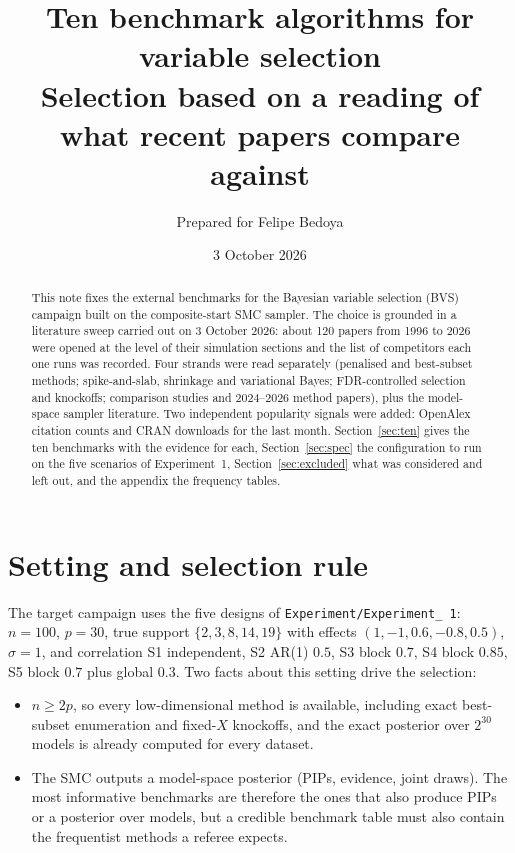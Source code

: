 \documentclass[11pt,letterpaper]{article}
\title{\bfseries Ten benchmark algorithms for variable selection\\[4pt]
\large Selection based on a reading of what recent papers compare against}
\author{Prepared for Felipe Bedoya}
\date{3 October 2026}
\newcommand{\code}[1]{\texttt{#1}}
\begin{document}
\maketitle

\begin{abstract}
\noindent This note fixes the external benchmarks for the Bayesian variable selection (BVS) campaign built on the composite-start SMC sampler. The choice is grounded in a literature sweep carried out on 3 October 2026: about 120 papers from 1996 to 2026 were opened at the level of their simulation sections and the list of competitors each one runs was recorded. Four strands were read separately (penalised and best-subset methods; spike-and-slab, shrinkage and variational Bayes; FDR-controlled selection and knockoffs; comparison studies and 2024--2026 method papers), plus the model-space sampler literature. Two independent popularity signals were added: OpenAlex citation counts and CRAN downloads for the last month. Section~\ref{sec:ten} gives the ten benchmarks with the evidence for each, Section~\ref{sec:spec} the configuration to run on the five scenarios of Experiment~1, Section~\ref{sec:excluded} what was considered and left out, and the appendix the frequency tables.
\end{abstract}

\tableofcontents

\section{Setting and selection rule}

The target campaign uses the five designs of \code{Experiment/Experiment\_ 1}: $n=100$, $p=30$, true support $\{2,3,8,14,19\}$ with effects $(1,-1,0.6,-0.8,0.5)$, $\sigma=1$, and correlation S1 independent, S2 AR(1) $0.5$, S3 block $0.7$, S4 block $0.85$, S5 block $0.7$ plus global $0.3$. Two facts about this setting drive the selection:
\begin{itemize}
\item $n\ge 2p$, so every low-dimensional method is available, including exact best-subset enumeration and fixed-$X$ knockoffs, and the exact posterior over $2^{30}$ models is already computed for every dataset.
\item The SMC outputs a model-space posterior (PIPs, evidence, joint draws). The most informative benchmarks are therefore the ones that also produce PIPs or a posterior over models, but a credible benchmark table must also contain the frequentist methods a referee expects.
\end{itemize}
\end{document}
